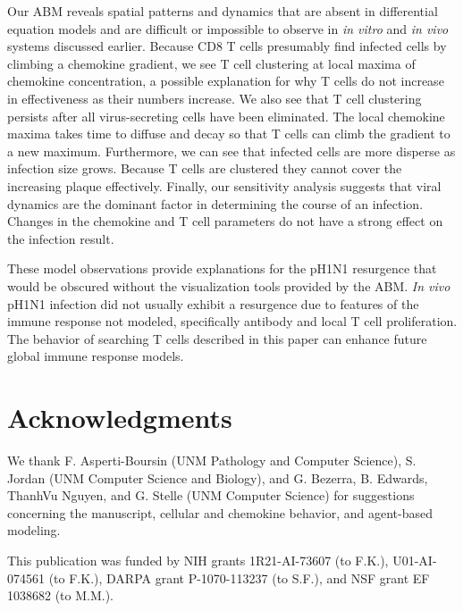 \documentclass[10pt]{article}
\begin{document}
Our ABM reveals spatial patterns and dynamics that are absent in differential equation models and are difficult or impossible to observe in \textit{in vitro} and \textit{in vivo} systems discussed earlier.  Because CD8 T cells presumably find infected cells by climbing a chemokine gradient, we see T cell clustering at local maxima of chemokine concentration, a possible explanation for why T cells do not increase in effectiveness as their numbers increase.   We also see that T cell clustering persists after all virus-secreting cells have been eliminated.  The local chemokine maxima takes time to diffuse and decay so that T cells can climb the gradient to a new maximum.  Furthermore, we can see that infected cells are more disperse as infection size grows.  Because T cells are clustered they cannot cover the increasing plaque effectively.  Finally, our sensitivity analysis suggests that viral dynamics are the dominant factor in determining the course of an infection.  Changes in the chemokine and T cell parameters do not have a strong effect on the infection result.

These model observations provide explanations for the pH1N1 resurgence that would be obscured without the visualization tools provided by the ABM.   \textit{In vivo} pH1N1 infection did not usually exhibit a resurgence due to features of the immune response not modeled, specifically antibody and local T cell proliferation.   The behavior of searching T cells described in this paper can enhance future global immune response models.




\section*{Acknowledgments}

We thank F. Asperti-Boursin (UNM Pathology and Computer Science), S. Jordan (UNM Computer Science and Biology), and G. Bezerra, B. Edwards, ThanhVu Nguyen, and G. Stelle (UNM Computer Science) for suggestions concerning the manuscript, cellular and chemokine behavior, and agent-based modeling.

This publication was funded by NIH grants 1R21-AI-73607 (to F.K.), U01-AI-074561 (to F.K.), DARPA grant P-1070-113237 (to S.F.), and NSF grant EF 1038682 (to M.M.).


\end{document}
